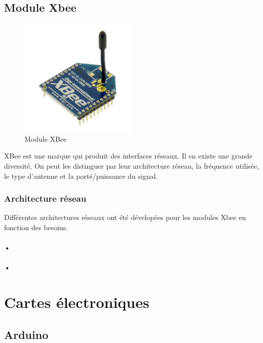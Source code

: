 \documentclass[a4paper, 11pt]{report}
\begin{document}
\section{Module Xbee}

\begin{figure}[h!]
\begin{centering}
\includegraphics[width=0.5\textwidth]{images/XBee.jpg}
\caption{Module XBee}
\par\end{centering}
\end{figure}

XBee est une marque qui produit des interfaces réseaux. Il en existe une grande diversité. On peut les distinguer par leur architecture réseau, la fréquence utilisée, le type d'antenne et la porté/puissance du signal.

\subsection{Architecture réseau}
Différentes architectures réseaux ont été dévelopées pour les modules Xbee en fonction des besoins.
\subsubsection{•}

\subsubsection{•}

\chapter{Cartes électroniques}

\section{Arduino}
\end{document}
